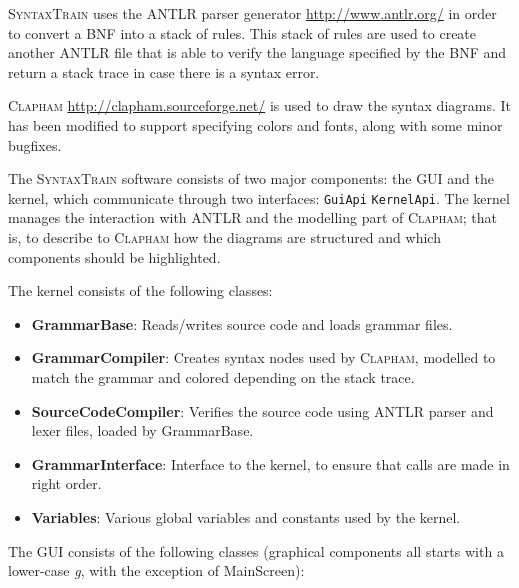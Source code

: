 \documentclass[11pt]{article}
\newcommand*{\st}{\textsc{SyntaxTrain}}
\newcommand*{\an}{\textsc{ANTLR}}
\newcommand*{\cp}{\textsc{Clapham}}
\begin{document}
\st{} uses the \an{} parser generator \url{http://www.antlr.org/} in
order to convert a BNF into a stack of rules. This stack of rules are used to
create another \an{} file that is able to verify the language specified
by the BNF and return a stack trace in case there is a syntax error.

\cp{} \url{http://clapham.sourceforge.net/} is used to draw the syntax
diagrams. It has been modified to support specifying colors and fonts,
along with some minor bugfixes.

The \st{} software consists of two major components: the GUI and the
kernel, which communicate through two interfaces: \texttt{GuiApi}
\texttt{KernelApi}. The kernel manages the interaction with \an{} and the modelling part of \cp{}; that is, to describe to \cp{} how the diagrams are structured and which components should be highlighted.

The kernel consists of the following classes:
\begin{itemize}
\item \textbf{GrammarBase}: Reads/writes source code and loads grammar files.
\item \textbf{GrammarCompiler}: Creates syntax nodes used by \cp{}, modelled to match the grammar and colored depending on the stack trace.
\item \textbf{SourceCodeCompiler}: Verifies the source code using \an{} parser and lexer files, loaded by GrammarBase.
\item \textbf{GrammarInterface}: Interface to the kernel, to ensure that calls are made in right order.
\item \textbf{Variables}: Various global variables and constants used by the kernel.
\end{itemize}

The GUI consists of the following classes (graphical components all starts with a lower-case \emph{g}, with the exception of MainScreen):
\end{document}
